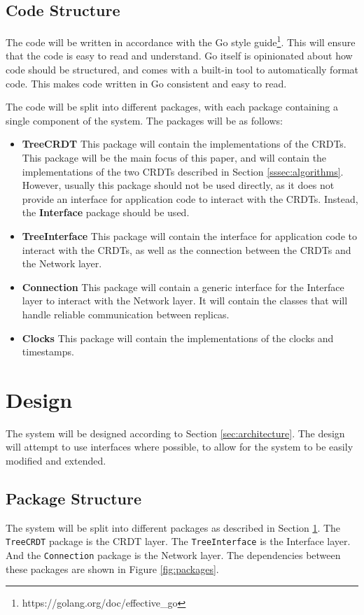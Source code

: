 \documentclass[12pt]{report}
\begin{document}
\section{Code Structure}\label{sec:code_structure}
The code will be written in accordance with the Go style guide\footnote{https://golang.org/doc/effective\_go}. This will ensure that the code is easy to read and understand. Go itself is opinionated about how code should be structured, and comes with a built-in tool to automatically format code. This makes code written in Go consistent and easy to read. \par

The code will be split into different packages, with each package containing a single component of the system. The packages will be as follows:
\begin{itemize}
    \item \textbf{TreeCRDT} This package will contain the implementations of the CRDTs. This package will be the main focus of this paper, and will contain the implementations of the two CRDTs described in Section \ref{sssec:algorithms}. However, usually this package should not be used directly, as it does not provide an interface for application code to interact with the CRDTs. Instead, the \textbf{Interface} package should be used. 
    \item \textbf{TreeInterface} This package will contain the interface for application code to interact with the CRDTs, as well as the connection between the CRDTs and the Network layer.
    \item \textbf{Connection} This package will contain a generic interface for the Interface layer to interact with the Network layer. It will contain the classes that will handle reliable communication between replicas.
    \item \textbf{Clocks} This package will contain the implementations of the clocks and timestamps.
\end{itemize}

\newpage
\chapter{Design}
The system will be designed according to Section \ref{sec:architecture}. The design will attempt to use interfaces where possible, to allow for the system to be easily modified and extended. 

\section{Package Structure}
The system will be split into different packages as described in Section \ref{sec:code_structure}. The \texttt{TreeCRDT} package is the CRDT layer. The \texttt{TreeInterface} is the Interface layer. And the \texttt{Connection} package is the Network layer. The dependencies between these packages are shown in Figure \ref{fig:packages}.
\end{document}
